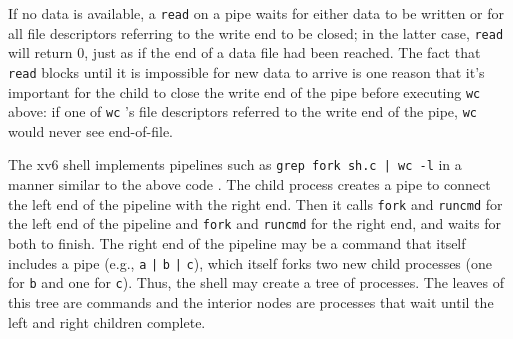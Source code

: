 If no data is available, a
\lstinline{read}
on a pipe waits for either data to be written or for all
file descriptors referring to the write end to be closed;
in the latter case,
\lstinline{read}
will return 0, just as if the end of a data file had been reached.
The fact that
\lstinline{read}
blocks until it is impossible for new data to arrive
is one reason that it's important for the child to
close the write end of the pipe
before executing
\lstinline{wc}
above: if one of
\lstinline{wc} 's
file descriptors referred to the write end of the pipe,
\lstinline{wc}
would never see end-of-file.

The xv6 shell implements pipelines such as
\lstinline{grep fork sh.c | wc -l}
in a manner similar to the above code
.
The child process creates a pipe to connect the left end of the pipeline
with the right end. Then it calls
\lstinline{fork}
and
\lstinline{runcmd}
for the left end of the pipeline
and 
\lstinline{fork}
and
\lstinline{runcmd}
for the right end, and waits for both to finish.
The right end of the pipeline may be a command that itself includes a
pipe (e.g.,
\lstinline{a}
\lstinline{|}
\lstinline{b}
\lstinline{|}
\lstinline{c}), 
which itself forks two new child processes (one for
\lstinline{b}
and one for
\lstinline{c}).
Thus, the shell may
create a tree of processes.  The leaves of this tree are commands and
the interior nodes are processes that wait until the left and right
children complete.



